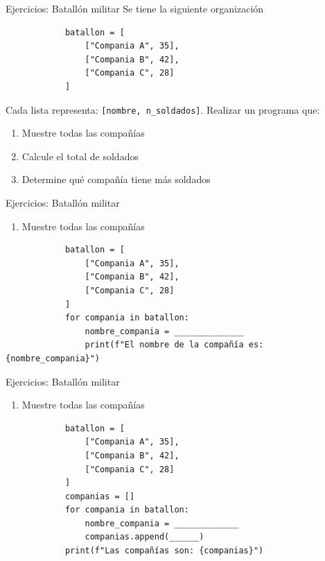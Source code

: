 \documentclass{beamer}
\begin{document}
    \begin{frame}[fragile, t]{Ejercicios: Batallón militar}
        Se tiene la siguiente organización
        \begin{verbatim}
            batallon = [
                ["Compania A", 35],
                ["Compania B", 42],
                ["Compania C", 28]
            ]
        \end{verbatim}
        Cada lista representa: \texttt{[nombre, n_soldados]}. Realizar un programa que:
        \begin{enumerate}
            \item Muestre todas las compañías
            \item Calcule el total de soldados
            \item Determine qué compañía tiene más soldados
        \end{enumerate}
    \end{frame}

    \begin{frame}[fragile, t]{Ejercicios: Batallón militar}
        \begin{enumerate}
            \item Muestre todas las compañías
        \end{enumerate}
        \begin{verbatim}
            batallon = [
                ["Compania A", 35],
                ["Compania B", 42],
                ["Compania C", 28]
            ]
            for compania in batallon:
                nombre_compania = ______________
                print(f"El nombre de la compañía es: {nombre_compania}")
            \end{verbatim}
    \end{frame}

    \begin{frame}[fragile, t]{Ejercicios: Batallón militar}
        \begin{enumerate}
            \item Muestre todas las compañías
        \end{enumerate}
        \begin{verbatim}
            batallon = [
                ["Compania A", 35],
                ["Compania B", 42],
                ["Compania C", 28]
            ]
            companias = []
            for compania in batallon:
                nombre_compania = _____________
                companias.append(______)
            print(f"Las compañías son: {companias}")
            \end{verbatim}
    \end{frame}
\end{document}
